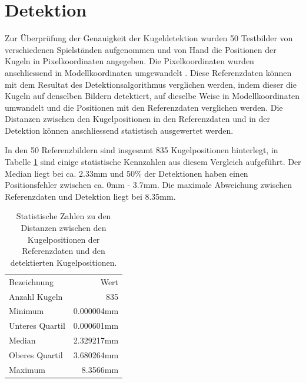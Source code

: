 \section{Detektion}
Zur Überprüfung der Genauigkeit der Kugeldetektion wurden 50 Testbilder von verschiedenen Spielständen aufgenommen
und von Hand die Positionen der Kugeln in Pixelkoordinaten angegeben.
Die Pixelkoordinaten wurden anschliessend in Modellkoordinaten umgewandelt \cite{project2:pixel_to_model_coordinates}.
Diese Referenzdaten können mit dem Resultat des Detektionsalgorithmus verglichen werden,
indem dieser die Kugeln auf denselben Bildern detektiert, auf dieselbe Weise in Modellkoordinaten umwandelt und
die Positionen mit den Referenzdaten verglichen werden.
Die Distanzen zwischen den Kugelpositionen in den Referenzdaten und in der Detektion können
anschliessend statistisch ausgewertet werden.

In den 50 Referenzbildern sind insgesamt 835 Kugelpositionen hinterlegt, in Tabelle \ref{tab:detektion_resultate_distanzen_stats}
sind einige statistische Kennzahlen aus diesem Vergleich aufgeführt. Der Median liegt bei ca. 2.33mm und 50\% der Detektionen
haben einen Positionsfehler zwischen ca. 0mm - 3.7mm. Die maximale Abweichung zwischen Referenzdaten und Detektion liegt bei 8.35mm.


\begin{table}[ht]
    \begin{tabular}{ lr }
        \rowcolor{\seccolor!50}
        Bezeichnung & Wert\\
        Anzahl Kugeln & 835\\
        Minimum & 0.000004mm\\
        Unteres Quartil & 0.000601mm\\
        Median & 2.329217mm\\
        Oberes Quartil & 3.680264mm\\
        Maximum & 8.3566mm
    \end{tabular}
    \caption{Statistische Zahlen zu den Distanzen zwischen den Kugelpositionen der Referenzdaten und den detektierten Kugelpositionen.}
    \label{tab:detektion_resultate_distanzen_stats}
\end{table}


